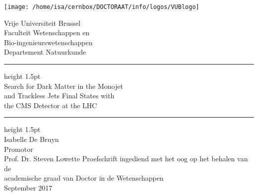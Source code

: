 \documentclass[10pt,a4paper,twoside,dutch,english]{book}
\def\hrulefill{\leavevmode\leaders\hrule height 1.5pt\hfill\kern 0pt \\}
\begin{document}
\graphicspath{{fig/}}

% 
 \thispagestyle{empty}   %
% 
 \noindent
 \begin{minipage}{3cm}%
   \texttt{[image: /home/isa/cernbox/DOCTORAAT/info/logos/VUBlogo]}
 \end{minipage}\hfill
 \begin{minipage}{8cm}
 \raggedleft
 \textsf{Vrije Universiteit Brussel\\ \vspace{.15cm}
 Faculteit Wetenschappen en\\
 Bio-ingenieurswetenschappen\\  \vspace{.15cm}
 Departement Natuurkunde}
 \end{minipage}
% 
\begin{center}
\vspace{5cm}
\bigskip
 \hrulefill \vspace{.2cm}
 \onehalfspacing
     \LARGE \noindent \textsf{Search for Dark Matter in the Monojet\\ and Trackless Jets Final States with \\the CMS Detector at the LHC}\\ 
 \hrulefill 
\vspace{1cm}
 \bigskip
   \Large\noindent \textsf{Isabelle De Bruyn} \\
 \bigskip
 \large
\vspace{2.5cm}
\textsf{Promotor\\ \vspace{.1cm}
Prof. Dr. Steven Lowette}
 \normalsize
 \vfill
 \textsf{Proefschrift ingediend met het oog op het behalen van de\\ academische graad van Doctor in de Wetenschappen\\ \vspace{.3cm}
 September 2017}\
 
 \end{center}

\clearpage{\pagestyle{empty}\cleardoublepage}

\end{document}
